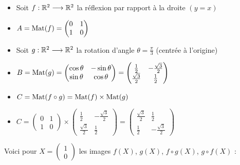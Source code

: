 \begin{frame}
\begin{exemple}
\begin{itemize}[<+->]\setlength{\itemsep}{8pt}
  \item Soit $f: \mathbb{R}^2 \longrightarrow \mathbb{R}^2$ 
  la réflexion par rapport à la droite $(y = x)$
  
  \item $A = \mathop{\text{Mat}}\nolimits(f) = \begin{pmatrix} 0 & 1 \\ 1 & 0 \end{pmatrix}$
  
  \item Soit $g: \mathbb{R}^2 \longrightarrow \mathbb{R}^2$ 
la rotation d'angle $\theta=\frac\pi3$ (centrée à l'origine)
  
  \item $B = \mathop{\text{Mat}}\nolimits(g) =  
\begin{pmatrix}
\cos\theta & -\sin\theta\\
\sin\theta & \cos\theta
\end{pmatrix}
=
\begin{pmatrix} 
\frac12 & -\frac{\sqrt3}{2} \\  
\frac{\sqrt3}{2} & \frac12
\end{pmatrix}
$
  
  \item $C = \mathop{\text{Mat}}\nolimits (f\circ g)  = \mathop{\text{Mat}}\nolimits (f) \times \mathop{\text{Mat}}\nolimits (g)$

  \item $C =\begin{pmatrix} 0 & 1 \\ 1 & 0 \end{pmatrix} \times  
\begin{pmatrix} \frac12 & -\frac{\sqrt3}{2} \\ \frac{\sqrt3}{2} & \frac12 \end{pmatrix}
= \begin{pmatrix} \frac{\sqrt3}{2} & \frac12  \\ \frac12 & -\frac{\sqrt3}{2}\end{pmatrix}
$
\end{itemize}

\end{exemple} 
\end{frame}


\begin{frame}
\begin{exemple}
Voici pour $X=\left(\begin{smallmatrix}1\\0\end{smallmatrix} \right)$ les images
$f(X)$, $g(X)$, $f\circ g(X)$, $g\circ f(X)$ :


\end{exemple} 
\end{frame}



